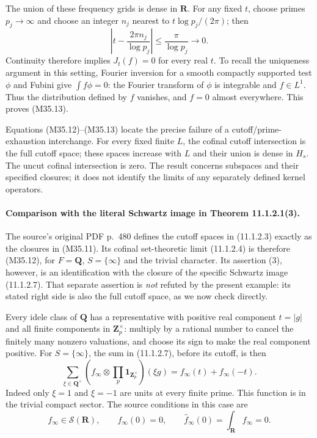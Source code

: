 The union of these frequency grids is dense in
$\mathbf R$.  For any fixed $t$, choose primes
$p_j\to\infty$ and choose an integer $n_j$ nearest to
$t\log p_j/(2\pi)$; then
\[
       \left|t-\frac{2\pi n_j}{\log p_j}\right|
                                  \le\frac\pi{\log p_j}\longrightarrow0.
 \tag{M35.16}
\]
Continuity therefore implies $J_t(f)=0$ for every real
$t$.  To recall the uniqueness argument in this setting,
Fourier inversion for a smooth compactly supported test
$\phi$ and Fubini give $\int f\phi=0$: the Fourier
transform of $\phi$ is integrable and $f\in L^1$.
Thus the distribution defined by $f$ vanishes, and
$f=0$ almost everywhere.  This proves (M35.13).

Equations (M35.12)--(M35.13) locate the precise failure
of a cutoff/prime-exhaustion interchange.  For every
fixed finite $L$, the cofinal cutoff intersection is
the full cutoff space; these spaces increase with $L$
and their union is dense in $H_s$.  The uncut cofinal
intersection is zero.  The result concerns subspaces
and their specified closures; it does not identify
the limits of any separately defined kernel operators.

\paragraph{Comparison with the literal Schwartz image in
Theorem 11.1.2.1(3).}
The source's original PDF p.~480 defines the cutoff
spaces in (11.1.2.3) exactly as the closures in (M35.11).
Its cofinal set-theoretic limit (11.1.2.4) is therefore
(M35.12), for $F=\mathbf Q$, $S=\{\infty\}$ and the
trivial character.  Its assertion (3), however, is an
identification with the closure of the specific Schwartz
image (11.1.2.7).  That separate assertion is \emph{not}
refuted by the present example: its stated right side is
also the full cutoff space, as we now check directly.

Every idele class of $\mathbf Q$ has a representative
with positive real component $t=|g|$ and all finite
components in $\mathbf Z_p^\times$: multiply by a rational
number to cancel the finitely many nonzero valuations,
and choose its sign to make the real component positive.
For $S=\{\infty\}$, the sum in (11.1.2.7), before
its cutoff, is then
\[
 \sum_{\xi\in\mathbf Q^\times}
   \left(f_\infty\otimes\prod_p\mathbf1_{\mathbf Z_p^\times}\right)
                   (\xi g)
                          =f_\infty(t)+f_\infty(-t).
 \tag{M35.17}
\]
Indeed only $\xi=1$ and $\xi=-1$ are units at every
finite prime.  This function is in the trivial compact
sector.  The source conditions in this case are
\[
 f_\infty\in\mathcal S(\mathbf R),\qquad
                  f_\infty(0)=0,\qquad
                  \widehat f_\infty(0)=\int_{\mathbf R}f_\infty=0.
 \tag{M35.18}
\]

